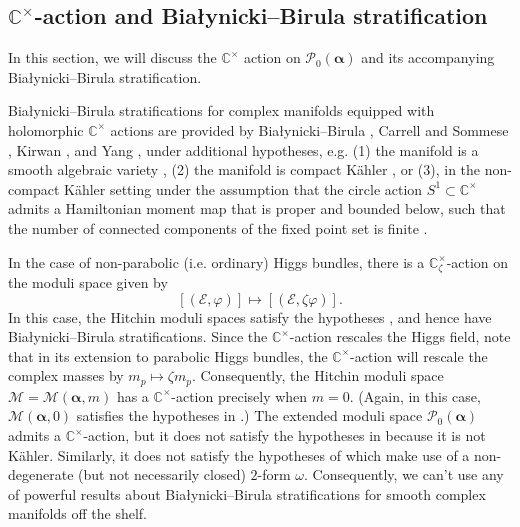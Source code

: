\documentclass[12pt,letterpaper,reqno]{amsart}
\def\mathbf#1{#1}%
\theoremstyle{remark}
\theoremstyle{definition}
\numberwithin{thm}{section}
\numberwithin{equation}{section}
\numberwithin{figure}{section}
\newcommand{\C}{\ensuremath{\mathbb C}}
\newcommand{\cE}{{\mathcal E}}
\newcommand{\bsa}{\boldsymbol{\alpha}}
\begin{document}
\subsection{\texorpdfstring{$\C^\times$}{C*}-action and \texorpdfstring{Bia{\l}ynicki--Birula}{Bialynicki-Birula} stratification}\label{sec:BBstratification}

In this section, we will discuss the $\C^\times$ action on  $\mathcal{P}_0(\bsa)$ and its accompanying Bia{\l}ynicki--Birula stratification. 

Bia{\l}ynicki--Birula stratifications for complex manifolds equipped with holomorphic $\C^\times$ actions are
provided by Bia{\l}ynicki--Birula \cite{BialynickiBirula1973,BialynickiBirula1974}, Carrell and Sommese \cite{CarrellSommese1979}, Kirwan \cite{Kirwan1988}, and Yang \cite{Yang2008}, under additional hypotheses, e.g. (1) the manifold is a smooth algebraic variety \cite{BialynickiBirula1973,BialynickiBirula1974}, (2) the manifold is compact K\"ahler \cite{CarrellSommese1979, Kirwan1988}, or (3), in the non-compact K\"ahler setting under the assumption that the circle action $S^1 \subset \C^\times$ admits a Hamiltonian moment map that is proper and bounded below, such that the number of connected components of the fixed point set is finite \cite{Yang2008}. 



In the case of non-parabolic (i.e. ordinary) Higgs bundles, there is a $\C^\times_\zeta$-action on the moduli space given by \[[(\cE, \varphi)] \mapsto [(\cE, \zeta \varphi)]. \]
In this case, the  Hitchin moduli spaces satisfy the hypotheses \cite{Yang2008}, and hence have Bia{\l}ynicki–Birula stratifications.
Since the $\C^\times$-action rescales the Higgs field, note that in its extension to parabolic Higgs bundles, the $\C^\times$-action will rescale the complex masses by $m_p \mapsto \zeta m_p$. Consequently, the Hitchin moduli space $\mathcal{M}=\mathcal{M}(\boldsymbol{\alpha}, \mathbf{m})$ has a $\C^\times$-action precisely when $\mathbf{m}=\mathbf{0}$. (Again, in this case, $\mathcal{M}(\boldsymbol{\alpha}, \mathbf{0})$ satisfies the hypotheses in \cite{Yang2008}.)  The extended moduli space $\mathcal{P}_0(\boldsymbol{\alpha})$ admits a $\C^\times$-action, but it does not satisfy the hypotheses in \cite{Yang2008} because it is not K\"ahler.   Similarly, it does not satisfy the hypotheses of \cite{Feehan2022} which make use of a non-degenerate (but not necessarily closed) $2$-form $\omega$. Consequently, we can't use any of powerful results about Bia{\l}ynicki--Birula stratifications for smooth complex manifolds off the shelf. 
\end{document}
